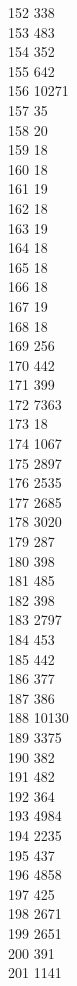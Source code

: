 { 152	338 \\
 153	483 \\
 154	352 \\
 155	642 \\
 156	10271 \\
 157	35 \\
 158	20 \\
 159	18 \\
 160	18 \\
 161	19 \\
 162	18 \\
 163	19 \\
 164	18 \\
 165	18 \\
 166	18 \\
 167	19 \\
 168	18 \\
 169	256 \\
 170	442 \\
 171	399 \\
 172	7363 \\
 173	18 \\
 174	1067 \\
 175	2897 \\
 176	2535 \\
 177	2685 \\
 178	3020 \\
 179	287 \\
 180	398 \\
 181	485 \\
 182	398 \\
 183	2797 \\
 184	453 \\
 185	442 \\
 186	377 \\
 187	386 \\
 188	10130 \\
 189	3375 \\
 190	382 \\
 191	482 \\
 192	364 \\
 193	4984 \\
 194	2235 \\
 195	437 \\
 196	4858 \\
 197	425 \\
 198	2671 \\
 199	2651 \\
 200	391 \\
 201	1141 \\
}
